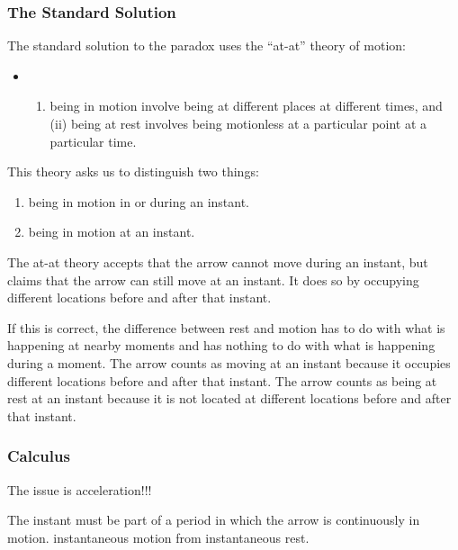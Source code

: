 \documentclass[]{article}
\begin{document}
\subsubsection{The Standard Solution}\label{the-standard-solution}

The standard solution to the paradox uses the ``at-at'' theory of
motion:

\begin{itemize}
\item
  \begin{enumerate}
  \def\labelenumi{(\roman{enumi})}
  \itemsep1pt\parskip0pt
  \item
    being in motion involve being at different places at different
    times, and (ii) being at rest involves being motionless at a
    particular point at a particular time.
  \end{enumerate}
\end{itemize}

This theory asks us to distinguish two things:

\begin{enumerate}
\def\labelenumi{\alph{enumi})}
\itemsep1pt\parskip0pt
\item
  being in motion in or during an instant.
\item
  being in motion at an instant.
\end{enumerate}

The at-at theory accepts that the arrow cannot move during an instant,
but claims that the arrow can still move at an instant. It does so by
occupying different locations before and after that instant.

If this is correct, the difference between rest and motion has to do
with what is happening at nearby moments and has nothing to do with what
is happening during a moment. The arrow counts as moving at an instant
because it occupies different locations before and after that instant.
The arrow counts as being at rest at an instant because it is not
located at different locations before and after that instant.

\subsubsection{Calculus}\label{calculus}

The issue is acceleration!!!

The instant must be part of a period in which the arrow is continuously
in motion. instantaneous motion from instantaneous rest.
\end{document}
